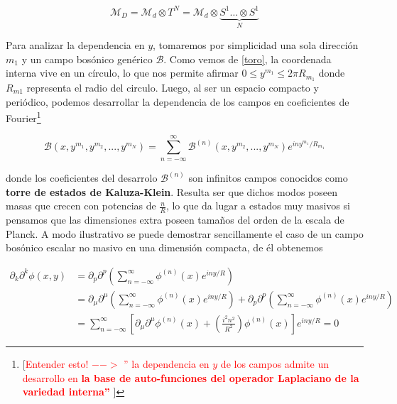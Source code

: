 \documentclass{article}
\numberwithin{equation}{section}
\begin{document}
\begin{equation}\label{toro}
\mathcal{M}_D = \mathcal{M}_d \otimes T^N = \mathcal{M}_d \otimes \underbrace{S^1 \dots \otimes S^1}_{N}
\end{equation}

Para analizar la dependencia en $ y $, tomaremos por simplicidad una sola dirección $ m_1 $ y un campo bosónico genérico $ \mathcal{B} $. Como vemos de \ref{toro}, la coordenada interna vive en un círculo, lo que nos permite afirmar $ 0\leq y^{m_1} \leq 2\pi R_{m_1}  $ donde $ R_{m1} $ representa el radio del circulo. Luego, al ser un espacio compacto y periódico, podemos desarrollar la dependencia de los campos en coeficientes de Fourier\footnote{[\textcolor{red}{Entender esto! $ --> $ '' la dependencia en $ y $ de los campos admite un desarrollo en \textbf{la base de auto-funciones del operador Laplaciano de la variedad interna''} }]}

\begin{equation}
\mathcal{B} (x,y^{m_1},y^{m_2},...,y^{m_N}) = \sum_{n=-\infty}^{\infty} \mathcal{B}^{(n)}(x, y^{m_2},...,y^{m_N}) e^{i n y^{m_1}/ R_{m_1}}
\end{equation}
	
donde los coeficientes del desarrolo $ \mathcal{B}^{(n)} $ son infinitos campos conocidos como \textbf{torre de estados de Kaluza-Klein}. Resulta ser que dichos modos poseen masas que crecen con potencias de $ \frac{n}{R} $, lo que da lugar a estados muy masivos si pensamos que las dimensiones extra poseen tamaños del orden de la escala de Planck. A modo ilustrativo se puede demostrar sencillamente el caso de un campo bosónico escalar no masivo en una dimensión compacta, de él obtenemos

\begin{equation}
\begin{aligned}
\partial_k \partial^k \phi (x,y) &= \partial_p \partial^p \left( \sum_{n=-\infty}^{\infty} \phi^{(n)}(x) e^{i n y / R} \right)\\
&= \partial_{\mu} \partial^{\mu}  \left( \sum_{n=-\infty}^{\infty} \phi^{(n)}(x) e^{i n y / R} \right) + \partial_p \partial^p  \left( \sum_{n=-\infty}^{\infty} \phi^{(n)}(x) e^{i n y / R} \right)\\
&= \sum_{n=-\infty}^{\infty} \left[ \partial_{\mu} \partial^{\mu} \phi^{(n)}(x) + \left(\frac{i^2 n^2}{R^2}\right) \phi^{(n)}(x) \right] e^{i n y / R} = 0
\end{aligned}
\end{equation}
\end{document}
